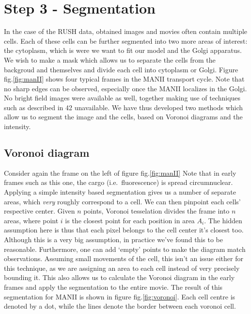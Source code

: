 \documentclass{Dissertate}
\begin{document}
\hypertarget{step-3---segmentation}{%
\section{Step 3 - Segmentation}\label{step-3---segmentation}}

In the case of the RUSH data, obtained images and movies often contain
multiple cells. Each of these cells can be further segmented into two
more areas of interest: the cytoplasm, which is were we want to fit our
model and the Golgi apparatus. We wish to make a mask which allows us to
separate the cells from the backgroud and themselves and divide each
cell into cytoplasm or Golgi. Figure fig.\ref{fig:manII} shows four
typical frames in the MANII transport cycle. Note that no sharp edges
can be observed, especially once the MANII localizes in the Golgi. No
bright field images were available as well, together making use of
techniques such as described in 42 unavailable. We have thus developed
two methods which allow us to segment the image and the cells, based on
Voronoi diagrams and the intensity.

\hypertarget{voronoi-diagram}{%
\subsection{Voronoi diagram}\label{voronoi-diagram}}

Consider again the frame on the left of figure fig.\ref{fig:manII} Note
that in early frames such as this one, the cargo (i.e.~fluorescence) is
spread circumnuclear. Applying a simple intensity based segmentation
gives us a number of separate areas, which \emph{very} roughly
correspond to a cell. We can then pinpoint each cells' respective
center. Given \(n\) points, Voronoi tesselation divides the frame into
\(n\) areas, where point \(i\) is the closest point for each position in
area \(A_i\). The hidden assumption here is thus that each pixel belongs
to the cell center it's closest too. Although this is a very big
assumption, in practice we've found this to be reasonable. Furthermore,
one can add `empty' points to make the diagram match observations.
Assuming small movements of the cell, this isn't an issue either for
this technique, as we are assigning an area to each cell instead of very
precisely bounding it. This also allows us to calculate the Voronoi
diagram in the early frames and apply the segmentation to the entire
movie. The result of this segmentation for MANII is shown in figure
fig.\ref{fig:voronoi}. Each cell centre is denoted by a dot, while the
lines denote the border between each voronoi cell.
\end{document}
